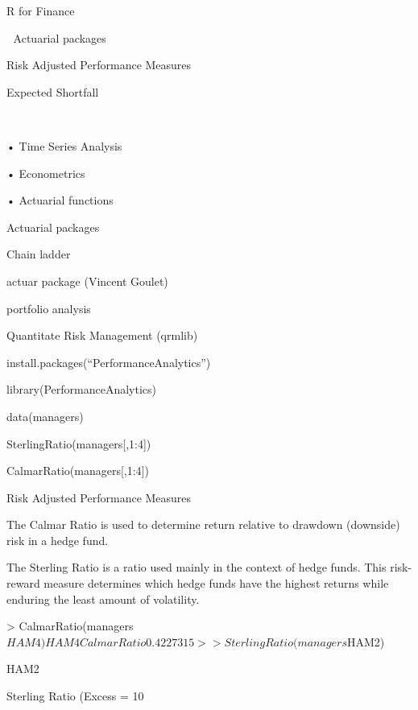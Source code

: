 
R for Finance


Actuarial packages

Risk Adjusted Performance Measures

Expected Shortfall



•
Time Series Analysis

•
Econometrics

•
Actuarial functions



 

Actuarial packages

Chain ladder

actuar package (Vincent Goulet)


portfolio analysis

Quantitate Risk Management (qrmlib)









install.packages(“PerformanceAnalytics”)

library(PerformanceAnalytics)


data(managers)

SterlingRatio(managers[,1:4])

CalmarRatio(managers[,1:4])
 






Risk Adjusted Performance Measures


The Calmar Ratio is used to determine return relative to drawdown (downside) risk in a hedge fund.


The Sterling Ratio is a ratio used mainly in the context of hedge funds. This risk-reward measure determines which hedge funds have the highest returns while enduring the least amount of volatility.









> CalmarRatio(managers$HAM4)

                  HAM4

Calmar Ratio 0.4227315

>

> SterlingRatio(managers$HAM2)

                                  HAM2

Sterling Ratio (Excess = 10%
 





